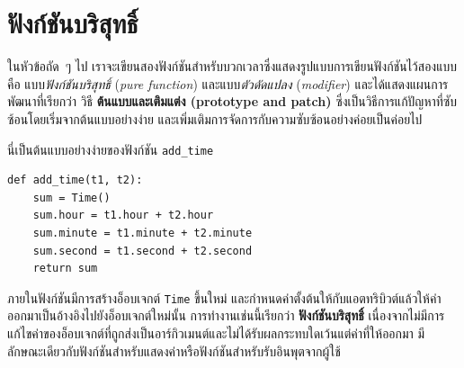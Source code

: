 \section{ฟังก์ชันบริสุทธิ์} %



ในหัวข้อถัด~ๆ ไป เราจะเขียนสองฟังก์ชันสำหรับบวกเวลาซึ่งแสดงรูปแบบการเขียนฟังก์ชันไว้สองแบบคือ 
แบบ\textit{ฟังก์ชันบริสุทธิ์} (\textit{pure function}) และแบบ\textit{ตัวดัดแปลง} (\textit{modifier}) และได้แสดงแผนการพัฒนาที่เรียกว่า วิธี
{\bf ต้นแบบและเติมแต่ง (prototype and patch)} ซึ่งเป็นวิธีการแก้ปัญหาที่ซับซ้อนโดยเริ่มจากต้นแบบอย่างง่าย 
และเพิ่มเติมการจัดการกับความซับซ้อนอย่างค่อยเป็นค่อยไป

นี่เป็นต้นแบบอย่างง่ายของฟังก์ชัน \verb"add_time"

\begin{verbatim}
def add_time(t1, t2):
    sum = Time()
    sum.hour = t1.hour + t2.hour
    sum.minute = t1.minute + t2.minute
    sum.second = t1.second + t2.second
    return sum
\end{verbatim}
%

ภายในฟังก์ชันมีการสร้างอ็อบเจกต์ {\tt Time} ขึ้นใหม่ และกำหนดค่าตั้งต้นให้กับแอตทริบิวต์แล้วให้ค่าออกมาเป็นอ้างอิงไปยังอ็อบเจกต์ใหม่นั้น 
การทำงานเช่นนี้เรียกว่า {\bf ฟังก์ชันบริสุทธิ์} เนื่องจากไม่มีการแก้ไขค่าของอ็อบเจกต์ที่ถูกส่งเป็นอาร์กิวเมนต์และไม่ได้รับผลกระทบใดเว้นแต่ค่าที่ให้ออกมา 
มีลักษณะเดียวกับฟังก์ชันสำหรับแสดงค่าหรือฟังก์ชันสำหรับรับอินพุตจากผู้ใช้


